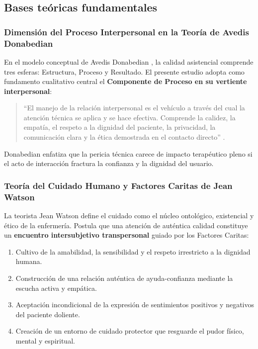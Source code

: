 \subsection{Bases teóricas fundamentales}
\label{sec:3.2_base_teorica}

\subsubsection{Dimensión del Proceso Interpersonal en la Teoría de Avedis Donabedian}
\label{sec:3.2.1_donabedian}
En el modelo conceptual de Avedis Donabedian \cite{donabedian1980, donabedian2005}, la calidad asistencial comprende tres esferas: Estructura, Proceso y Resultado. El presente estudio adopta como fundamento cualitativo central el \textbf{Componente de Proceso en su vertiente interpersonal}:
\begin{quote}
``El manejo de la relación interpersonal es el vehículo a través del cual la atención técnica se aplica y se hace efectiva. Comprende la calidez, la empatía, el respeto a la dignidad del paciente, la privacidad, la comunicación clara y la ética demostrada en el contacto directo'' \cite{donabedian2005}.
\end{quote}
Donabedian enfatiza que la pericia técnica carece de impacto terapéutico pleno si el acto de interacción fractura la confianza y la dignidad del usuario.

\subsubsection{Teoría del Cuidado Humano y Factores Caritas de Jean Watson}
\label{sec:3.2.2_watson}
La teorista Jean Watson \cite{watson2008} define el cuidado como el núcleo ontológico, existencial y ético de la enfermería. Postula que una atención de auténtica calidad constituye un \textbf{encuentro intersubjetivo transpersonal} guiado por los Factores Caritas:
\begin{enumerate}
    \item Cultivo de la amabilidad, la sensibilidad y el respeto irrestricto a la dignidad humana.
    \item Construcción de una relación auténtica de ayuda-confianza mediante la escucha activa y empática.
    \item Aceptación incondicional de la expresión de sentimientos positivos y negativos del paciente doliente.
    \item Creación de un entorno de cuidado protector que resguarde el pudor físico, mental y espiritual.
\end{enumerate}


